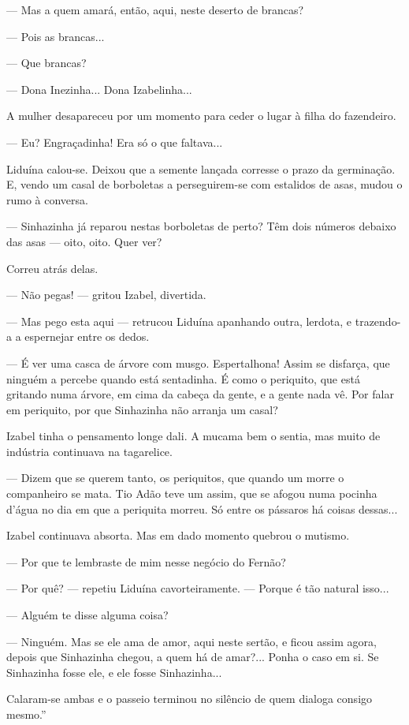 --- Mas a quem amará, então, aqui, neste deserto de brancas?

--- Pois as brancas...

--- Que brancas?

--- Dona Inezinha... Dona Izabelinha...

A mulher desapareceu por um momento para ceder o lugar à filha do
fazendeiro.

--- Eu? Engraçadinha! Era só o que faltava...

Liduína calou-se. Deixou que a semente lançada corresse o prazo da
germinação. E, vendo um casal de borboletas a perseguirem-se com
estalidos de asas, mudou o rumo à conversa.

--- Sinhazinha já reparou nestas borboletas de perto? Têm dois números
debaixo das asas --- oito, oito. Quer ver?

Correu atrás delas.

--- Não pegas! --- gritou Izabel, divertida.

--- Mas pego esta aqui --- retrucou Liduína apanhando outra, lerdota, e
trazendo-a a espernejar entre os dedos.

--- É ver uma casca de árvore com musgo. Espertalhona! Assim se
disfarça, que ninguém a percebe quando está sentadinha. É como o
periquito, que está gritando numa árvore, em cima da cabeça da gente, e
a gente nada vê. Por falar em periquito, por que Sinhazinha não arranja
um casal?

Izabel tinha o pensamento longe dali. A mucama bem o sentia, mas muito
de indústria continuava na tagarelice.

--- Dizem que se querem tanto, os periquitos, que quando um morre o
companheiro se mata. Tio Adão teve um assim, que se afogou numa pocinha
d'água no dia em que a periquita morreu. Só entre os pássaros há coisas
dessas...

Izabel continuava absorta. Mas em dado momento quebrou o mutismo.

--- Por que te lembraste de mim nesse negócio do Fernão?

--- Por quê? --- repetiu Liduína cavorteiramente. --- Porque é tão
natural isso...

--- Alguém te disse alguma coisa?

--- Ninguém. Mas se ele ama de amor, aqui neste sertão, e ficou assim
agora, depois que Sinhazinha chegou, a quem há de amar?... Ponha o caso
em si. Se Sinhazinha fosse ele, e ele fosse Sinhazinha...

Calaram-se ambas e o passeio terminou no silêncio de quem dialoga
consigo mesmo.''

